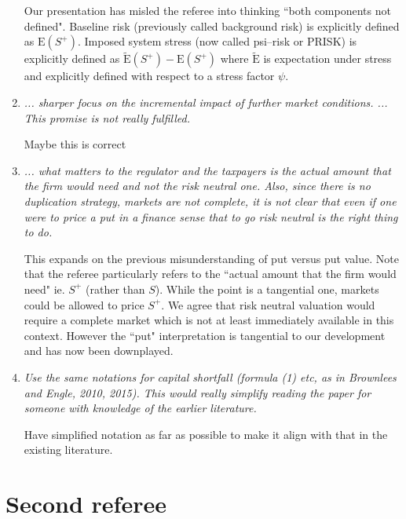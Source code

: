 \documentclass[11pt]{amsart}
\newcommand{\E}{{\mathrm E}}
\newcommand{\Es}{\widetilde\E}
\begin{document}
\begin{enumerate}
Our presentation has  misled the referee into thinking ``both components not defined".     Baseline risk (previously called background risk) is explicitly defined as $\E(S^+)$.   Imposed system stress (now called psi--risk or PRISK) is explicitly defined as  $\Es(S^+)-\E(S^+)$
where $\Es$ is expectation under stress and explicitly defined with respect to a stress factor $\psi$.  

\item {\it ... sharper focus on the incremental impact of further market conditions. ... This promise is not really fulfilled.}

Maybe this is correct

\item {\it ... what matters to the regulator and the taxpayers is the actual amount that the firm would need and not the risk neutral one. Also, since there is no duplication strategy, markets are not complete, it is not clear that even if one were to price a put in a finance sense that to go risk neutral is the right thing to do.}

This expands on the previous misunderstanding of put versus put value.   Note that the referee particularly refers to the ``actual amount that the firm would need"  ie.  $S^+$ (rather than $S$).   While the point is a tangential one, markets could be allowed to price $S^+$.   We agree that risk neutral valuation would require a complete market which is not at least immediately available in this context.  However the ``put" interpretation is tangential to our development and has now been downplayed.


\item {\it Use the same notations for capital shortfall (formula (1) etc, as
in Brownlees and Engle, 2010, 2015). This would really simplify reading the paper for someone with knowledge of the earlier literature.}

Have simplified notation as far as possible to make it align with that in the existing literature.

\end{enumerate}

\newpage
\section{Second referee}
\end{document}

